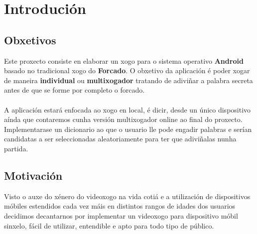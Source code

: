 \chapter{Introdución}
\label{chap:introducion}
\section{Obxetivos}
Este proxecto consiste en elaborar un xogo para o sistema operativo \textbf{Android} basado no tradicional xogo do \textbf{Forcado}. O obxetivo da aplicación é poder xogar de maneira \textbf{individual} ou \textbf{multixogador} tratando de adiviñar a palabra secreta antes de que se forme por completo o forcado.\\
\\
A aplicación estará enfocada ao xogo en local, é dicir, desde un único dispositivo aínda que contaremos cunha versión multixogador online ao final do proxecto. Implementarase un dicionario ao que o usuario lle pode engadir palabras e serían candidatas a ser seleccionadas aleatoriamente para ter que adiviñalas nunha partida.

\section{Motivación}
Visto o auxe do xénero do videoxogo na vida cotiá e a utilización de dispositivos móbiles estendidos cada vez máis en distintos rangos de idades dos usuarios decidimos decantarnos por implementar un videoxogo para dispositivo móbil sinxelo, fácil de utilizar, entendible e apto para todo tipo de público.


